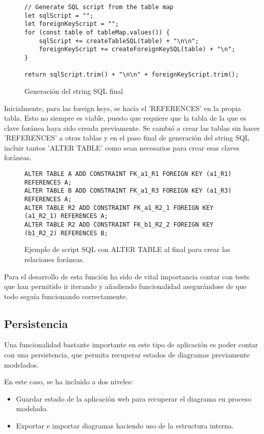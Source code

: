 \begin{figure}[h]
\lstset{breaklines=true, basicstyle=\footnotesize}
\begin{lstlisting}[frame=single]
// Generate SQL script from the table map
let sqlScript = "";
let foreignKeyScript = "";
for (const table of tableMap.values()) {
    sqlScript += createTableSQL(table) + "\n\n";
    foreignKeyScript += createForeignKeySQL(table) + "\n";
}

return sqlScript.trim() + "\n\n" + foreignKeyScript.trim();
\end{lstlisting}
\caption{Generación del string SQL final}
\end{figure}

Inicialmente, para las foreign keys, se hacía el {'}REFERENCES{'} en la propia tabla. Esto no siempre es viable, puesto que requiere que la tabla de la que es clave foránea haya sido creada previamente.
Se cambió a crear las tablas sin hacer {'}REFERENCES{'} a otras tablas y en el paso final de generación del string SQL incluir tantos {'}ALTER TABLE{'} como sean necesarios para crear esas claves foráneas.

\begin{figure}[h]
\lstset{breaklines=true, basicstyle=\footnotesize}
\begin{lstlisting}[frame=single]
ALTER TABLE A ADD CONSTRAINT FK_a1_R1 FOREIGN KEY (a1_R1) REFERENCES A;
ALTER TABLE B ADD CONSTRAINT FK_a1_R3 FOREIGN KEY (a1_R3) REFERENCES A;
ALTER TABLE R2 ADD CONSTRAINT FK_a1_R2_1 FOREIGN KEY (a1_R2_1) REFERENCES A;
ALTER TABLE R2 ADD CONSTRAINT FK_b1_R2_2 FOREIGN KEY (b1_R2_2) REFERENCES B;
\end{lstlisting}
\caption{Ejemplo de script SQL con ALTER TABLE al final para crear las relaciones foráneas.}
\end{figure}

Para el desarrollo de esta función ha sido de vital importancia contar con tests que han permitido ir iterando y añadiendo funcionalidad asegurándose de que todo seguía funcionando correctamente.

\subsection{Persistencia}
Una funcionalidad bastante importante en este tipo de aplicación es poder contar con una persistencia, que permita recuperar estados de diagramas previamente modelados.

En este caso, se ha incluido a dos niveles:
\begin{itemize}
    \item Guardar estado de la aplicación web para recuperar el diagrama en proceso modelado.
    \item Exportar e importar diagramas haciendo uso de la estructura interna.
\end{itemize}

